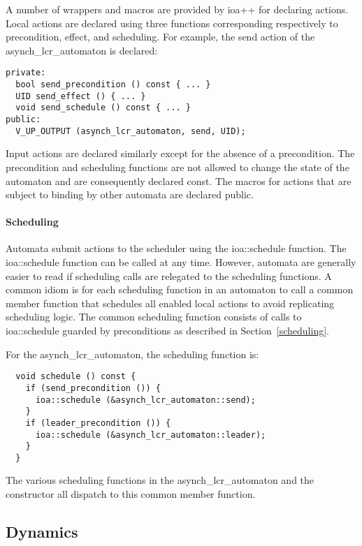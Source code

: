 A number of wrappers and macros are provided by ioa++ for declaring actions.
Local actions are declared using three functions corresponding respectively to precondition, effect, and scheduling.
\ifjournal
For example, the send action of the asynch\_lcr\_automaton is declared:
\begin{lstlisting}
private:
  bool send_precondition () const { ... }
  UID send_effect () { ... }
  void send_schedule () const { ... }
public:
  V_UP_OUTPUT (asynch_lcr_automaton, send, UID);
\end{lstlisting}
\fi
Input actions are declared similarly except for the absence of a precondition.
The precondition and scheduling functions are not allowed to change the state of the automaton and are consequently declared const.
The macros for actions that are subject to binding by other automata are declared public.

\paragraph*{Scheduling}
Automata submit actions to the scheduler using the ioa::schedule function.
The ioa::schedule function can be called at any time.
However, automata are generally easier to read if scheduling calls are relegated to the scheduling functions.
A common idiom is for each scheduling function in an automaton to call a common member function that schedules all enabled local actions to avoid replicating scheduling logic.
The common scheduling function consists of calls to ioa::schedule guarded by preconditions as described in Section~\ref{scheduling}.

\ifjournal
For the asynch\_lcr\_automaton, the scheduling function is:
\begin{lstlisting}
  void schedule () const {
    if (send_precondition ()) {
      ioa::schedule (&asynch_lcr_automaton::send);
    }
    if (leader_precondition ()) {
      ioa::schedule (&asynch_lcr_automaton::leader);
    }
  }
\end{lstlisting}
The various scheduling functions in the asynch\_lcr\_automaton and the constructor all dispatch to this common member function.
\fi

\subsection{Dynamics\label{dynamic_composition}}

